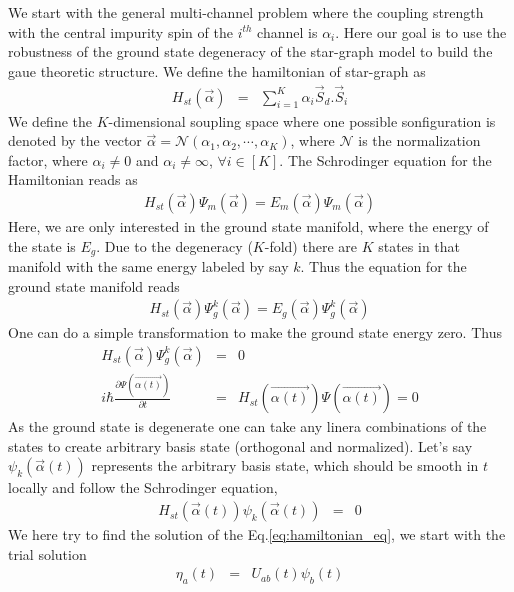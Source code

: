 \documentclass[reprint,prb,superscriptaddress]{revtex4-1}
\begin{document}
We start with the general multi-channel problem where the coupling strength with the central impurity spin of the $i^{th}$ channel is $\alpha_i$. Here our goal is to use the robustness of the ground state degeneracy of the star-graph model to build the gaue theoretic structure. We define the hamiltonian of star-graph as 
\begin{eqnarray}
H_{st}(\vec{\alpha}) &=& \displaystyle\sum_{i=1}^{K} \alpha_i \vec{S}_d.\vec{S}_i
\end{eqnarray}
We define the $K$-dimensional soupling space where one possible sonfiguration is denoted by the vector $\vec{\alpha}=\mathcal{N}(\alpha_1,\alpha_2,\cdots,\alpha_K)$, where $\mathcal{N}$ is the normalization factor, where $\alpha_i\neq 0$ and $\alpha_i\neq \infty $, $\forall i\in[K]$. The Schrodinger equation for the Hamiltonian reads as 
\begin{eqnarray}
H_{st}(\vec{\alpha}) \Psi_{m} (\vec{\alpha}) = E_{m} (\vec{\alpha}) \Psi_{m} (\vec{\alpha})
\end{eqnarray}
Here, we are only interested in the ground state manifold, where the energy of the state is $E_{g}$. Due to the degeneracy ($K$-fold) there are $K$ states in that manifold with the same energy labeled by say $k$. Thus the equation for the ground state manifold reads
\begin{eqnarray}
H_{st}(\vec{\alpha}) \Psi^{k}_{g} (\vec{\alpha}) = E_{g} (\vec{\alpha}) \Psi^{k}_{g} (\vec{\alpha})
\end{eqnarray}
One can do a simple transformation to make the ground state energy zero. Thus
\begin{eqnarray}
H_{st}(\vec{\alpha}) \Psi^{k}_{g} (\vec{\alpha}) &=&  0 \nonumber\\
i\hbar \frac{\partial \Psi(\vec{\alpha(t)}) }{\partial t} &=& H_{st}(\vec{\alpha(t)}) \Psi(\vec{\alpha(t)}) =0
\label{eq:hamiltonian_eq}
\end{eqnarray}
As the ground state is degenerate one can take any linera combinations of the states to create arbitrary basis state (orthogonal and normalized). Let's say $\psi_k(\vec{\alpha}(t))$ represents the arbitrary basis state, which should  be smooth in $t$ locally and follow the Schrodinger equation,
\begin{eqnarray}
H_{st}(\vec{\alpha}(t)) \psi_k(\vec{\alpha}(t)) &=&  0 
\end{eqnarray}
We here try to find the solution of the Eq.\eqref{eq:hamiltonian_eq}, we start with the trial solution 
\begin{eqnarray}
\eta_a(t) &=& U_{ab}(t) \psi_b(t)
\end{eqnarray}
\end{document}
